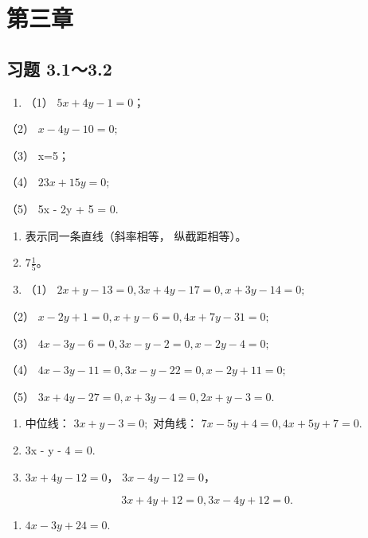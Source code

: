 \section{第三章}\label{ux7b2cux4e09ux7ae0}

\subsection{习题 3.1～3.2}\label{ux4e60ux9898-3.13.2}

\begin{enumerate}
\def\labelenumi{\arabic{enumi}.}
\tightlist
\item
  （1） \(5x + 4y - 1 = 0\)；
\end{enumerate}

（2） \(x - 4y - 10 = 0;\)

（3） x=5；

（4） \(23x + 15y = 0;\)

（5） 5x - 2y + 5 = 0.

\begin{enumerate}
\def\labelenumi{\arabic{enumi}.}
\setcounter{enumi}{1}
\item
  表示同一条直线（斜率相等， 纵截距相等）。
\item
  \(7\frac{1}{5}\)。
\item
  （1） \(2x + y - 13 = 0, 3x + 4y - 17 = 0, x + 3y - 14 = 0;\)
\end{enumerate}

（2） \(x - 2y + 1 = 0, x + y - 6 = 0, 4x + 7y - 31 = 0;\)

（3） \(4x - 3y - 6 = 0, 3x - y - 2 = 0, x - 2y - 4 = 0;\)

（4） \(4x - 3y - 11 = 0, 3x - y - 22 = 0, x - 2y + 11 = 0;\)

（5） \(3x + 4y - 27 = 0, x + 3y - 4 = 0, 2x + y - 3 = 0.\)

\begin{enumerate}
\def\labelenumi{\arabic{enumi}.}
\setcounter{enumi}{4}
\item
  中位线： \(3x+y-3=0;\) 对角线： \(7x - 5y + 4 = 0, 4x + 5y + 7 = 0.\)
\item
  3x - y - 4 = 0.
\item
  \(3x + 4y - 12 = 0\)， \(3x - 4y - 12 = 0\)，
\end{enumerate}

\[
3 x + 4 y + 12 = 0, 3 x - 4 y + 12 = 0.
\]

\begin{enumerate}
\def\labelenumi{\arabic{enumi}.}
\setcounter{enumi}{10}
\tightlist
\item
  \(4x - 3y + 24 = 0.\)
\end{enumerate}

